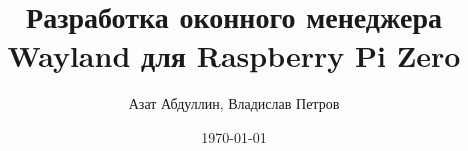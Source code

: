 
\title{Разработка оконного менеджера Wayland для Raspberry Pi Zero}

\author{Азат Абдуллин, Владислав Петров}


\date{\today}


